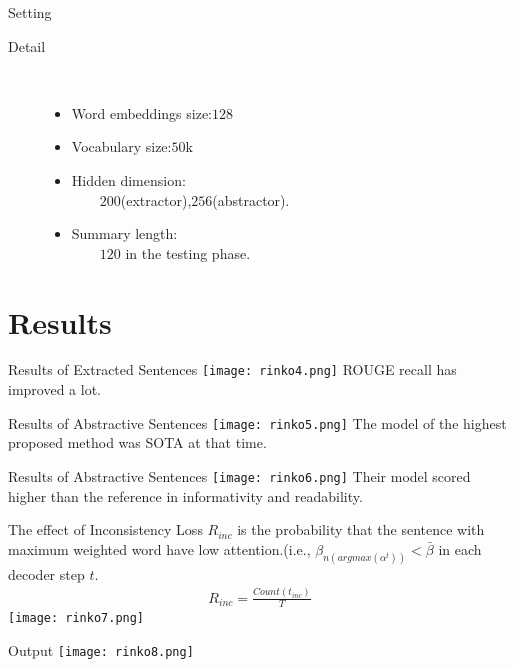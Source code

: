 \documentclass[17pt, unicode,dvipdfmx]{beamer}
\begin{document}
\begin{frame}{Setting}
    \begin{description}
      \item [Detail]~\\ 
        \begin{itemize}
          \item Word embeddings size:$128$
          \item Vocabulary size:$50$k
          \item Hidden dimension:\\~~~~$200$(extractor),$256$(abstractor).
          \item Summary length:\\~~~~$120$ in the testing phase.
        \end{itemize}
    \end{description}
\end{frame}

\section{Results}
\begin{frame}{Results of Extracted Sentences}
\texttt{[image: rinko4.png]}
ROUGE recall has improved a lot.
\end{frame}

\begin{frame}{Results of Abstractive Sentences}
  \texttt{[image: rinko5.png]}
The model of the highest proposed method was SOTA at that time.
\end{frame}

\begin{frame}{Results of Abstractive Sentences}
  \texttt{[image: rinko6.png]}
Their model scored higher than the reference in informativity and readability.
\end{frame}

\begin{frame}{The effect of Inconsistency Loss}
   $R_{inc}$ is the probability that the sentence with maximum weighted word have low attention.(i.e., $\beta_{n(argmax(\alpha^t))}<\bar{\beta}$ in each decoder step $t$.
  \begin{align}
    R_{inc}=\frac{Count(t_{inc})}{T}
  \end{align}
  \texttt{[image: rinko7.png]}
\end{frame}

\begin{frame}{Output}
  \texttt{[image: rinko8.png]}
\end{frame}
\end{document}
